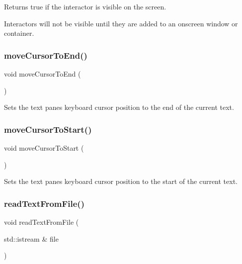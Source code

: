 Returns true if the interactor is visible on the screen. 

Interactors will not be visible until they are added to an onscreen window or container. \mbox{\label{classGBrowserPane_ab5ef729cac166db0ef51ff7ea30d1bb8}} 
\subsubsection{\texorpdfstring{move\+Cursor\+To\+End()}{moveCursorToEnd()}}
{\footnotesize\ttfamily void move\+Cursor\+To\+End (\begin{DoxyParamCaption}{ }\end{DoxyParamCaption})\hspace{0.3cm}{\ttfamily [virtual]}}



Sets the text pane\textquotesingle{}s keyboard cursor position to the end of the current text. 

\mbox{\label{classGBrowserPane_a24abdceab57bcff96185afbadf193a22}} 
\subsubsection{\texorpdfstring{move\+Cursor\+To\+Start()}{moveCursorToStart()}}
{\footnotesize\ttfamily void move\+Cursor\+To\+Start (\begin{DoxyParamCaption}{ }\end{DoxyParamCaption})\hspace{0.3cm}{\ttfamily [virtual]}}



Sets the text pane\textquotesingle{}s keyboard cursor position to the start of the current text. 

\mbox{\label{classGBrowserPane_a5e6d9158a9311204ca49518c32072ce0}} 
\subsubsection{\texorpdfstring{read\+Text\+From\+File()}{readTextFromFile()}\hspace{0.1cm}{\footnotesize\ttfamily [1/2]}}
{\footnotesize\ttfamily void read\+Text\+From\+File (\begin{DoxyParamCaption}\item[{std\+::istream \&}]{file }\end{DoxyParamCaption})\hspace{0.3cm}{\ttfamily [virtual]}}



